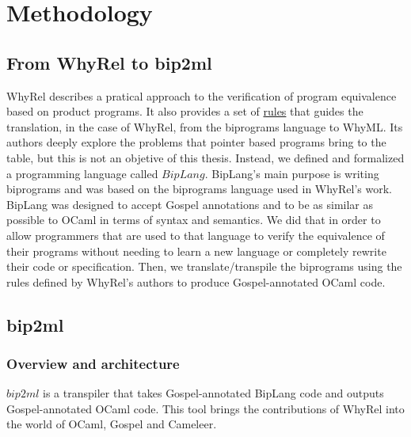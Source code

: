 
%

\chapter{Methodology}
\label{cha:methodology}


\FloatBarrier
\section{From WhyRel to bip2ml}
\label{sec:whyrel_to_bip2ml}

WhyRel describes a pratical approach to the verification of program equivalence based on product programs.
It also provides a set of \hyperref[fig:translation-biprograms-rules]{rules} that guides the translation, in the case of WhyRel, from the biprograms language to WhyML.
Its authors deeply explore the problems that pointer based programs bring to the table, but this is not an objetive of this thesis.
Instead, we defined and formalized a programming language called $BipLang$.
BipLang's main purpose is writing biprograms and was based on the biprograms language used in WhyRel's work.
BipLang was designed to accept Gospel annotations and to be as similar as possible to OCaml in terms of syntax and semantics.
We did that in order to allow programmers that are used to that language to verify the equivalence of their programs without needing to learn a new language or completely rewrite their code or specification.
Then, we translate/transpile the biprograms using the rules defined by WhyRel's authors to produce Gospel-annotated OCaml code.


\FloatBarrier
\section{bip2ml}
\label{sec:bip2ml}

\FloatBarrier
\subsection{Overview and architecture}
\label{subsec:bip2ml_overview}

$bip2ml$ is a transpiler that takes Gospel-annotated BipLang code and outputs Gospel-annotated OCaml code.
This tool brings the contributions of WhyRel into the world of OCaml, Gospel and Cameleer.


